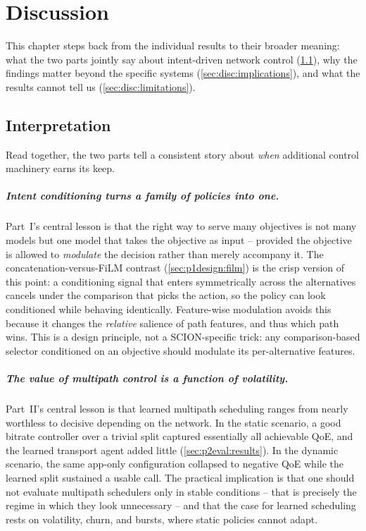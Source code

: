 \chapter{Discussion}
\label{ch:discussion}

This chapter steps back from the individual results to their broader meaning: what the two parts jointly
say about intent-driven network control (\cref{sec:disc:interpretation}), why the findings matter beyond
the specific systems (\cref{sec:disc:implications}), and what the results cannot tell us
(\cref{sec:disc:limitations}).

\section{Interpretation}
\label{sec:disc:interpretation}

Read together, the two parts tell a consistent story about \emph{when} additional control machinery earns
its keep.

\paragraph{Intent conditioning turns a family of policies into one.} Part~I's central lesson is that the
right way to serve many objectives is not many models but one model that takes the objective as input --
provided the objective is allowed to \emph{modulate} the decision rather than merely accompany it. The
concatenation-versus-FiLM contrast (\cref{sec:p1design:film}) is the crisp version of this point: a
conditioning signal that enters symmetrically across the alternatives cancels under the comparison that
picks the action, so the policy can look conditioned while behaving identically. Feature-wise modulation
avoids this because it changes the \emph{relative} salience of path features, and thus which path wins. This
is a design principle, not a SCION-specific trick: any comparison-based selector conditioned on an
objective should modulate its per-alternative features.

\paragraph{The value of multipath control is a function of volatility.} Part~II's central lesson is that
learned multipath scheduling ranges from nearly worthless to decisive depending on the network. In the
static scenario, a good bitrate controller over a trivial split captured essentially all achievable QoE, and
the learned transport agent added little (\cref{sec:p2eval:results}). In the dynamic scenario, the same
app-only configuration collapsed to negative QoE while the learned split sustained a usable call. The
practical implication is that one should not evaluate multipath schedulers only in stable conditions -- that
is precisely the regime in which they look unnecessary -- and that the case for learned scheduling rests on
volatility, churn, and bursts, where static policies cannot adapt.

